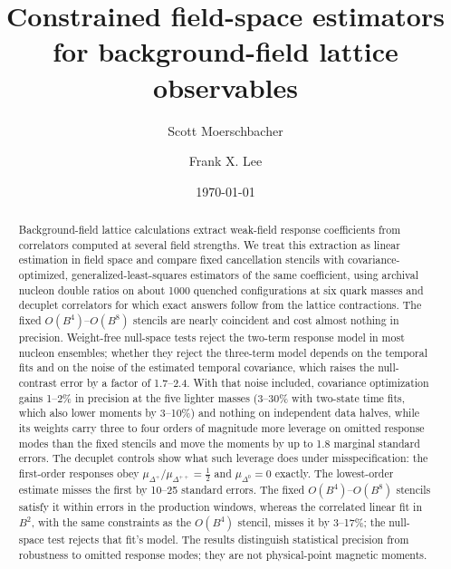 \documentclass[aps,prd,preprint,nofootinbib,floatfix]{revtex4-2}
\begin{document}
\title{Constrained field-space estimators for background-field lattice observables}

\author{Scott Moerschbacher}

\author{Frank X. Lee}

\date{\today}

\begin{abstract}
Background-field lattice calculations extract weak-field response coefficients from correlators computed at several field strengths. We treat this extraction as linear estimation in field space and compare fixed cancellation stencils with covariance-optimized, generalized-least-squares estimators of the same coefficient, using archival nucleon double ratios on about 1000 quenched configurations at six quark masses and decuplet correlators for which exact answers follow from the lattice contractions. The fixed $O(B^4)$--$O(B^8)$ stencils are nearly coincident and cost almost nothing in precision. Weight-free null-space tests reject the two-term response model in most nucleon ensembles; whether they reject the three-term model depends on the temporal fits and on the noise of the estimated temporal covariance, which raises the null-contrast error by a factor of 1.7--2.4. With that noise included, covariance optimization gains 1--2\% in precision at the five lighter masses (3--30\% with two-state time fits, which also lower moments by 3--10\%) and nothing on independent data halves, while its weights carry three to four orders of magnitude more leverage on omitted response modes than the fixed stencils and move the moments by up to 1.8 marginal standard errors. The decuplet controls show what such leverage does under misspecification: the first-order responses obey $\mu_{\Delta^+}/\mu_{\Delta^{++}}=\tfrac12$ and $\mu_{\Delta^0}=0$ exactly. The lowest-order estimate misses the first by 10--25 standard errors. The fixed $O(B^4)$--$O(B^8)$ stencils satisfy it within errors in the production windows, whereas the correlated linear fit in $B^2$, with the same constraints as the $O(B^4)$ stencil, misses it by 3--17\%; the null-space test rejects that fit's model. The results distinguish statistical precision from robustness to omitted response modes; they are not physical-point magnetic moments.
\end{abstract}

\maketitle
\end{document}
